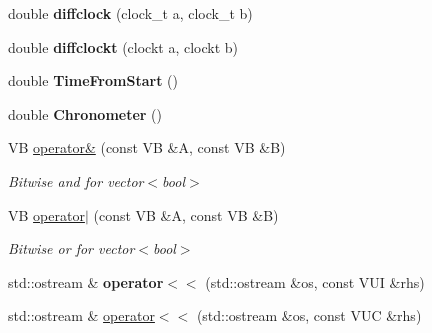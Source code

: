 \begin{DoxyCompactItemize}
\item 
\hypertarget{namespacedscr_a5e8832d5ea31873a72dd44e95a24c17a}{double {\bfseries diffclock} (clock\-\_\-t a, clock\-\_\-t b)}\label{namespacedscr_a5e8832d5ea31873a72dd44e95a24c17a}

\item 
\hypertarget{namespacedscr_a84b32784caf9463edd1d48c169a0f387}{double {\bfseries diffclockt} (clockt a, clockt b)}\label{namespacedscr_a84b32784caf9463edd1d48c169a0f387}

\item 
\hypertarget{namespacedscr_a16b200e54d4dec25384519b87321c1bf}{double {\bfseries Time\-From\-Start} ()}\label{namespacedscr_a16b200e54d4dec25384519b87321c1bf}

\item 
\hypertarget{namespacedscr_abb430c7d91f899467ffada4bbe5ae153}{double {\bfseries Chronometer} ()}\label{namespacedscr_abb430c7d91f899467ffada4bbe5ae153}

\item 
\hypertarget{namespacedscr_a700bc3316a1f4f6e8c16256161b519db}{V\-B \hyperlink{namespacedscr_a700bc3316a1f4f6e8c16256161b519db}{operator\&} (const V\-B \&A, const V\-B \&B)}\label{namespacedscr_a700bc3316a1f4f6e8c16256161b519db}

\begin{DoxyCompactList}\small\item\em Bitwise and for vector$<$bool$>$ \end{DoxyCompactList}\item 
\hypertarget{namespacedscr_ac20e04e5f20654a2d7b298b8440ab8f6}{V\-B \hyperlink{namespacedscr_ac20e04e5f20654a2d7b298b8440ab8f6}{operator$|$} (const V\-B \&A, const V\-B \&B)}\label{namespacedscr_ac20e04e5f20654a2d7b298b8440ab8f6}

\begin{DoxyCompactList}\small\item\em Bitwise or for vector$<$bool$>$ \end{DoxyCompactList}\item 
\hypertarget{namespacedscr_aa8d9c3d1a253c42368b34749878a1815}{std\-::ostream \& {\bfseries operator$<$$<$} (std\-::ostream \&os, const V\-U\-I \&rhs)}\label{namespacedscr_aa8d9c3d1a253c42368b34749878a1815}

\item 
\hypertarget{namespacedscr_a90c88bd52f1b37a4fcc4d28625108b32}{std\-::ostream \& \hyperlink{namespacedscr_a90c88bd52f1b37a4fcc4d28625108b32}{operator$<$$<$} (std\-::ostream \&os, const V\-U\-C \&rhs)}\label{namespacedscr_a90c88bd52f1b37a4fcc4d28625108b32}


\end{DoxyCompactItemize}
